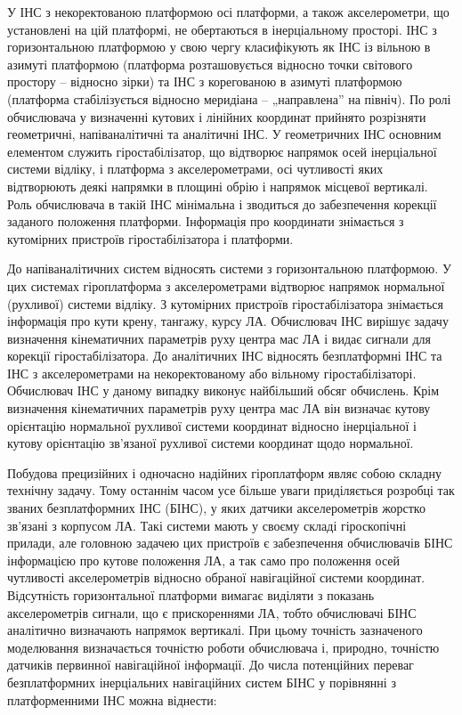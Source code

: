 У ІНС з некоректованою платформою осі платформи, а також акселерометри, що установлені на 
цій платформі, не обертаються в інерціальному просторі. 
ІНС з горизонтальною платформою у свою чергу класифікують як ІНС із вільною в 
азимуті платформою (платформа розташовується відносно точки світового простору – відносно зірки) 
та ІНС з корегованою в азимуті платформою (платформа стабілізується відносно меридіана – „направлена” на північ).
По ролі обчислювача у визначенні кутових і лінійних координат прийнято 
розрізняти геометричні, напіваналітичні та аналітичні ІНС. У геометричних ІНС 
основним елементом служить гіростабілізатор, що відтворює напрямок осей інерціальної 
системи відліку, і платформа з акселерометрами, осі чутливості яких відтворюють деякі 
напрямки в площині обрію і напрямок місцевої вертикалі. Роль обчислювача в такій ІНС 
мінімальна і зводиться до забезпечення корекції заданого положення платформи. Інформація 
про координати знімається з кутомірних пристроїв гіростабілізатора і платформи.

До напіваналітичних систем відносять системи з горизонтальною платформою. У 
цих системах гіроплатформа з акселерометрами відтворює напрямок нормальної (рухливої) 
системи відліку. З кутомірних пристроїв гіростабілізатора знімається інформація про 
кути крену, тангажу, курсу ЛА. Обчислювач ІНС вирішує задачу визначення кінематичних 
параметрів руху центра мас ЛА і видає сигнали для корекції гіростабілізатора.
До аналітичних ІНС відносять безплатформні ІНС та ІНС з акселерометрами на некоректованому 
або вільному гіростабілізаторі. Обчислювач ІНС у даному випадку виконує найбільший обсяг 
обчислень. Крім визначення кінематичних параметрів руху центра мас ЛА він визначає кутову 
орієнтацію нормальної рухливої системи координат відносно інерціальної і кутову орієнтацію 
зв'язаної рухливої системи координат щодо нормальної. 

Побудова прецизійних і одночасно надійних гіроплатформ являє собою складну технічну задачу. 
Тому останнім часом усе більше уваги приділяється розробці так званих безплатформних ІНС (БІНС), 
у яких датчики акселерометрів жорстко зв’язані з корпусом ЛА. Такі системи мають у своєму складі 
гіроскопічні прилади, але головною задачею цих пристроїв є забезпечення обчислювачів БІНС 
інформацією про кутове положення ЛА, а так само про положення осей чутливості акселерометрів 
відносно обраної навігаційної системи координат. Відсутність горизонтальної платформи вимагає 
виділяти з показань акселерометрів сигнали, що є прискореннями ЛА, тобто обчислювачі БІНС 
аналітично визначають напрямок вертикалі. При цьому точність зазначеного моделювання 
визначається точністю роботи обчислювача і, природно, точністю датчиків первинної навігаційної інформації.
До числа потенційних переваг безплатформних інерціальних навігаційних систем БІНС у 
порівнянні з платформенними ІНС можна віднести:

